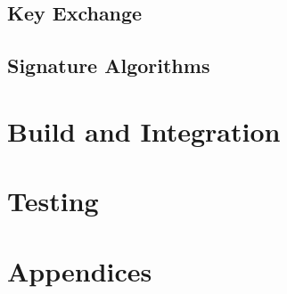 \documentclass[11pt,a4paper]{report}
\theoremstyle{definitionstyle}
\begin{document}
\section{Key Exchange}

\section{Signature Algorithms}

\chapter{Build and Integration}

\chapter{Testing}


\newpage


\newpage
\appendix
\chapter*{Appendices}
\end{document}

